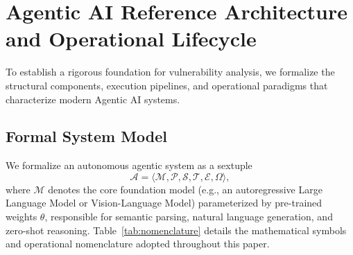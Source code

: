 \section{Agentic AI Reference Architecture and Operational Lifecycle}
\label{sec:architecture}

To establish a rigorous foundation for vulnerability analysis, we formalize the structural components, execution pipelines, and operational paradigms that characterize modern Agentic AI systems.

\subsection{Formal System Model}
\label{subsec:formal_system_model}

We formalize an autonomous agentic system as a sextuple
\begin{equation}
    \mathcal{A} = \langle \mathcal{M}, \mathcal{P}, \mathcal{S}, \mathcal{T}, \mathcal{E}, \Omega \rangle,
\end{equation}
where $\mathcal{M}$ denotes the core foundation model (e.g., an autoregressive Large Language Model or Vision-Language Model) parameterized by pre-trained weights $\theta$, responsible for semantic parsing, natural language generation, and zero-shot reasoning. Table~\ref{tab:nomenclature} details the mathematical symbols and operational nomenclature adopted throughout this paper.




